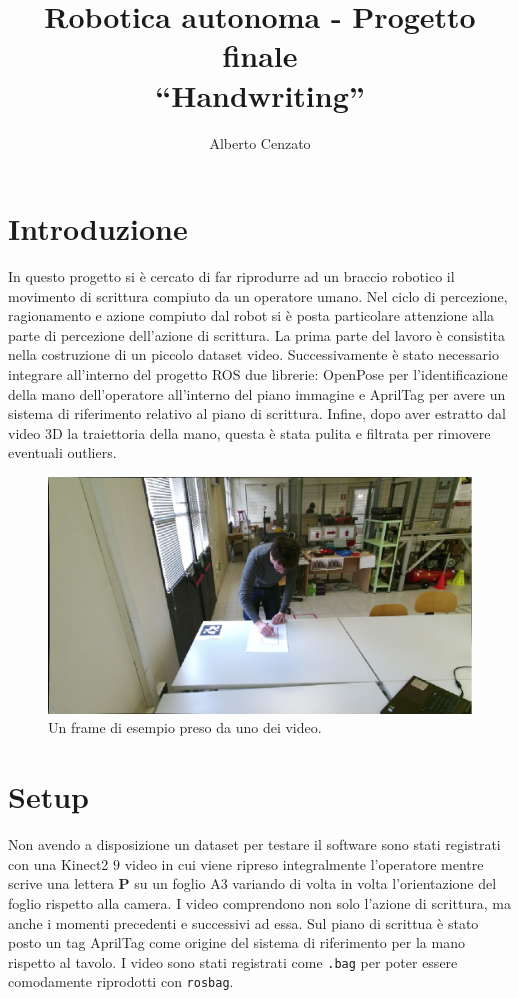 \documentclass[10pt,twocolumn]{article}
\begin{document}
\title{Robotica autonoma - Progetto finale \\``Handwriting''}
\author{Alberto Cenzato}
\maketitle

\section{Introduzione}
In questo progetto si è cercato di far riprodurre ad un braccio robotico il
movimento di scrittura compiuto da un operatore umano. Nel ciclo di percezione,
ragionamento e azione compiuto dal robot si è posta particolare attenzione alla
parte di percezione dell'azione di scrittura. La prima parte del lavoro è
consistita nella costruzione di un piccolo dataset video. Successivamente è
stato necessario integrare all'interno del progetto ROS due librerie: OpenPose
per l'identificazione della mano dell'operatore all'interno del piano immagine e
AprilTag per avere un sistema di riferimento relativo al piano di scrittura.
Infine, dopo aver estratto dal video 3D la traiettoria della mano, questa è
stata pulita e filtrata per rimovere eventuali outliers.

\begin{figure}[h]
  \centering	
  \includegraphics[width=\linewidth]{immagini/setup.png}
  \caption{Un frame di esempio preso da uno dei video.}
  \label{f:setup}
\end{figure}


\section{Setup}
Non avendo a disposizione un dataset per testare il software sono stati
registrati con una Kinect2 $9$ video in cui viene ripreso integralmente
l'operatore mentre scrive una lettera \textbf{P} su un foglio A3 variando di
volta in volta l'orientazione del foglio rispetto alla camera. I video
comprendono non solo l'azione di scrittura, ma anche i momenti precedenti e
successivi ad essa. Sul piano di scrittua è stato posto un tag AprilTag come
origine del sistema di riferimento per la mano rispetto al tavolo. I video sono
stati registrati come \verb|.bag| per poter essere comodamente riprodotti con
\verb|rosbag|.
\end{document}
